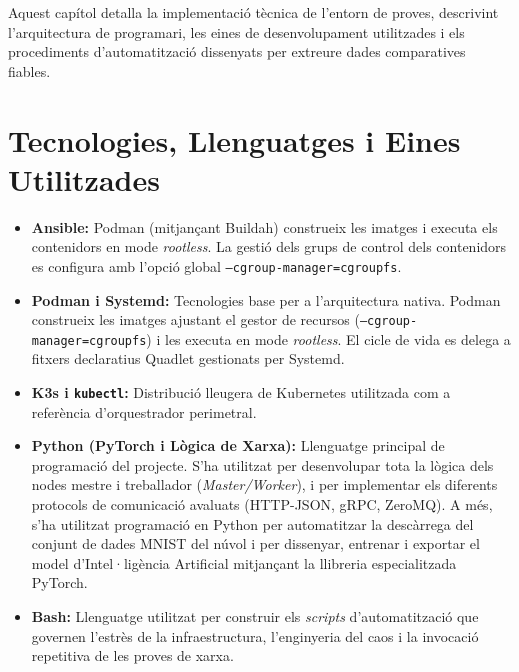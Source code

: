 %
%

Aquest capítol detalla la implementació tècnica de l'entorn de proves, descrivint l'arquitectura de programari, les eines de desenvolupament utilitzades i els procediments d'automatització dissenyats per extreure dades comparatives fiables.
\section{Tecnologies, Llenguatges i Eines Utilitzades}
\begin{itemize}
    \item \textbf{Ansible:} Podman (mitjançant Buildah) construeix les imatges i executa els contenidors en mode \textit{rootless}. La gestió dels grups de control dels contenidors es configura amb l'opció global \texttt{--cgroup-manager=cgroupfs}.
    \item \textbf{Podman i Systemd:} Tecnologies base per a l'arquitectura nativa. Podman construeix les imatges ajustant el gestor de recursos (\texttt{--cgroup-manager=cgroupfs}) i les executa en mode \textit{rootless}. El cicle de vida es delega a fitxers declaratius Quadlet gestionats per Systemd.  
    \item \textbf{K3s i \texttt{kubectl}:} Distribució lleugera de Kubernetes utilitzada com a referència d'orquestrador perimetral.  
    \item \textbf{Python (PyTorch i Lògica de Xarxa):} Llenguatge principal de programació del projecte. S'ha utilitzat per desenvolupar tota la lògica dels nodes mestre i treballador (\textit{Master/Worker}), i per implementar els diferents protocols de comunicació avaluats (HTTP-JSON, gRPC, ZeroMQ). A més, s'ha utilitzat programació en Python per automatitzar la descàrrega del conjunt de dades MNIST del núvol i per dissenyar, entrenar i exportar el model d'Intel·ligència Artificial mitjançant la llibreria especialitzada PyTorch.
    \item \textbf{Bash:} Llenguatge utilitzat per construir els \textit{scripts} d'automatització que governen l'estrès de la infraestructura, l'enginyeria del caos i la invocació repetitiva de les proves de xarxa.
\end{itemize}

